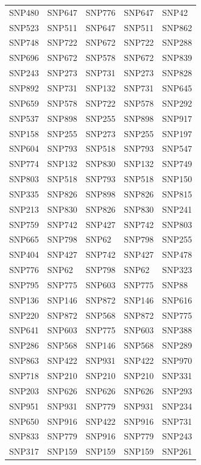 \begin{table}[ht]
\begin{tabular}{lllll}
  SNP480 & SNP647 & SNP776 & SNP647 & SNP42 \\ 
  SNP523 & SNP511 & SNP647 & SNP511 & SNP862 \\ 
  SNP748 & SNP722 & SNP672 & SNP722 & SNP288 \\ 
  SNP696 & SNP672 & SNP578 & SNP672 & SNP839 \\ 
  SNP243 & SNP273 & SNP731 & SNP273 & SNP828 \\ 
  SNP892 & SNP731 & SNP132 & SNP731 & SNP645 \\ 
  SNP659 & SNP578 & SNP722 & SNP578 & SNP292 \\ 
  SNP537 & SNP898 & SNP255 & SNP898 & SNP917 \\ 
  SNP158 & SNP255 & SNP273 & SNP255 & SNP197 \\ 
  SNP604 & SNP793 & SNP518 & SNP793 & SNP547 \\ 
  SNP774 & SNP132 & SNP830 & SNP132 & SNP749 \\ 
  SNP803 & SNP518 & SNP793 & SNP518 & SNP150 \\ 
  SNP335 & SNP826 & SNP898 & SNP826 & SNP815 \\ 
  SNP213 & SNP830 & SNP826 & SNP830 & SNP241 \\ 
  SNP759 & SNP742 & SNP427 & SNP742 & SNP803 \\ 
  SNP665 & SNP798 & SNP62 & SNP798 & SNP255 \\ 
  SNP404 & SNP427 & SNP742 & SNP427 & SNP478 \\ 
  SNP776 & SNP62 & SNP798 & SNP62 & SNP323 \\ 
  SNP795 & SNP775 & SNP603 & SNP775 & SNP88 \\ 
  SNP136 & SNP146 & SNP872 & SNP146 & SNP616 \\ 
  SNP220 & SNP872 & SNP568 & SNP872 & SNP775 \\ 
  SNP641 & SNP603 & SNP775 & SNP603 & SNP388 \\ 
  SNP286 & SNP568 & SNP146 & SNP568 & SNP289 \\ 
  SNP863 & SNP422 & SNP931 & SNP422 & SNP970 \\ 
  SNP718 & SNP210 & SNP210 & SNP210 & SNP331 \\ 
  SNP203 & SNP626 & SNP626 & SNP626 & SNP293 \\ 
  SNP951 & SNP931 & SNP779 & SNP931 & SNP234 \\ 
  SNP650 & SNP916 & SNP422 & SNP916 & SNP731 \\ 
  SNP833 & SNP779 & SNP916 & SNP779 & SNP243 \\ 
  SNP317 & SNP159 & SNP159 & SNP159 & SNP261 \\ 

\end{tabular}
\end{table}

